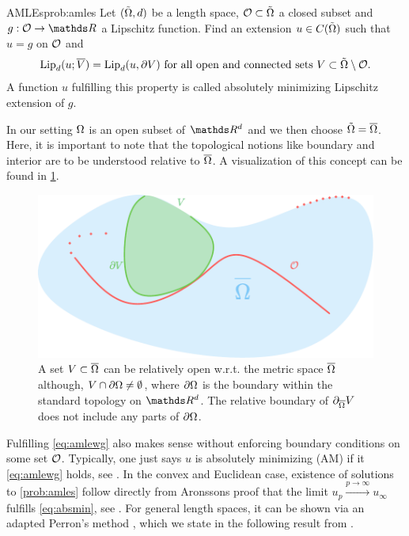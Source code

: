 %
\begin{problem}{AMLEs}{prob:amles}
Let $(\tilde{\Omega}, d)$ be a length space, $\mathcal{O}\subset\tilde{\Omega}$ a closed subset and $g:\conset\to\R$ a Lipschitz function. Find an extension $u\in C(\tilde{\Omega})$ such that $u=g$ on $\mathcal{O}$ and
%
\begin{align}\label{eq:amlewg}
\operatorname{Lip}_d(u; \overline{V}) = \operatorname{Lip}_d(u, \partial V) \text{ for all open and connected sets } V\subset \tilde{\Omega}\setminus \mathcal{O}.
\end{align}
%
A function $u$ fulfilling this property is called absolutely minimizing Lipschitz extension of $g$.
\end{problem}
%
\begin{remark}{}{}
In our setting $\Omega$ is an open subset of $\R^d$ and we then choose $\tilde{\Omega} = \overline{\Omega}$. Here, it is important to note that 
the topological notions like boundary and interior are to be understood relative to $\overline{\Omega}$. A visualization of this concept can be found in \cref{fig:relb}.
\end{remark}
%
\begin{figure}
\begin{center}
\includegraphics[width=.5\textwidth]{atelier/SSL/relboundary.pdf}
\end{center}
\caption[Visualization of the relative boundary.]{A set $V\subset\overline{\Omega}$ can be relatively open w.r.t. the metric space $\overline{\Omega}$ although, $V\cap\partial\Omega \neq\emptyset$, where $\partial \Omega$ is the boundary within the standard topology on $\R^d$. The relative boundary of $\partial_{\overline{\Omega}} V$ does not include any parts of $\partial \Omega$.}\label{fig:relb}
\end{figure}
%
%
\noindent%
Fulfilling \cref{eq:amlewg} also makes sense without enforcing boundary conditions on some set $\mathcal{O}$. Typically, one just says $u$ is absolutely minimizing (AM) if it \cref{eq:amlewg} holds, see \cite{aronsson2004tour}. In the convex and Euclidean case, existence of solutions to \cref{prob:amles} follow directly from Aronssons proof that the limit $u_p\xrightarrow{p\to\infty} u_\infty$ fulfills \cref{eq:absmin}, see \cite{aronsson1967extension}. For general length spaces, it can be shown via an adapted Perron's method \cite{perron1923neue}, which we state in the following result from \cite{juutinen2002absolutely}.

